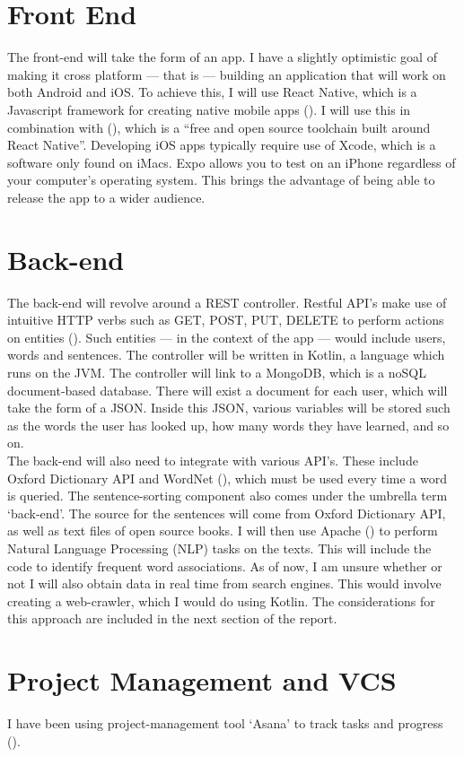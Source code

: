 \section{Front End}
The front-end will take the form of an app. I have a slightly optimistic goal of making it cross platform --- that is --- building an application that will work on both Android and iOS. To achieve this, I will use React Native, which is a Javascript framework for creating native mobile apps (\cite{reactNative}). I will use this in combination with (\cite{Expo}), which is a ``free and open source toolchain built around React Native''. Developing iOS apps typically require use of Xcode, which is a software only found on iMacs. Expo allows you to test on an iPhone regardless of your computer's operating system. This brings the advantage of being able to release the app to a wider audience.

\section{Back-end}

The back-end will revolve around a REST controller. Restful API's make use of intuitive HTTP verbs such as GET, POST, PUT, DELETE to perform actions on entities (\cite{richardson2008restful}). Such entities --- in the context of the app --- would include users, words and sentences. The controller will be written in Kotlin, a language which runs on the JVM. The controller will link to a MongoDB, which is a noSQL document-based database. There will exist a document for each user, which will take the form of a JSON. Inside this JSON, various variables will be stored such as the words the user has looked up, how many words they have learned, and so on.\\

The back-end will also need to integrate with various API's. These include Oxford Dictionary API and WordNet\textsuperscript{\textregistered} (\cite{miller1995wordnet}), which must be used every time a word is queried. The sentence-sorting component also comes under the umbrella term `back-end'. The source for the sentences will come from Oxford Dictionary API, as well as text files of open source books. I will then use  Apache (\cite{apache}) to perform Natural Language Processing (NLP) tasks on the texts. This will include the code to identify frequent word associations. As of now, I am unsure whether or not I will also obtain data in real time from search engines. This would involve creating a web-crawler, which I would do using Kotlin. The considerations for this approach are included in the next section of the report.

\section{Project Management and VCS}

I have been using project-management tool `Asana' to track tasks and progress (\cite{asana}).



